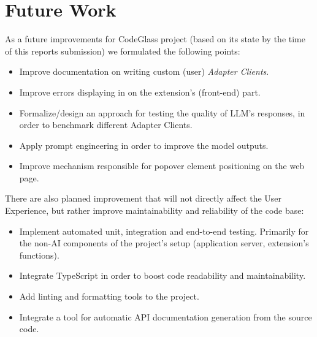 \section{Future Work}

As a future improvements for CodeGlass project (based on its state by the time
of this reports submission) we formulated the following points:

\begin{itemize}
    \item Improve documentation on writing custom (user) \emph{Adapter Clients}.
    \item Improve errors displaying in on the extension's (front-end) part.
    \item Formalize/design an approach for testing the quality of LLM's responses,
        in order to benchmark different Adapter Clients.
    \item Apply prompt engineering in order to improve the model outputs.
    \item Improve mechanism responsible for popover element positioning on the
        web page.
\end{itemize}

There are also planned improvement that will not directly affect the User Experience,
but rather improve maintainability and reliability of the code base:

\begin{itemize}
    \item Implement automated unit, integration and end-to-end testing. Primarily
        for the non-AI components of the project's setup (application server,
        extension's functions).
    \item Integrate TypeScript in order to boost code readability and
        maintainability.
    \item Add linting and formatting tools to the project.
    \item Integrate a tool for automatic API documentation generation from the
        source code.
\end{itemize}
